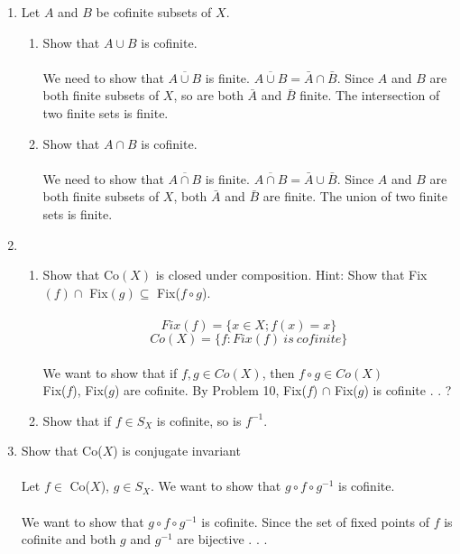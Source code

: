 \documentclass[11pt]{article}
\begin{document}
\begin{enumerate}
\newpage
\item Let $A$ and $B$ be cofinite subsets of $X$.\\
\begin{enumerate}
\item Show that $A \cup B$ is cofinite.\\\\
We need to show that $\overline{A \cup B}$ is finite.  $\overline{A \cup B} = \bar{A} \cap \bar{B}$. Since $A$ and $B$ are both finite subsets of $X$, so are both $\bar{A}$ and $\bar{B}$ finite.  The intersection of two finite sets is finite.
\item Show that $A \cap B$ is cofinite.\\\\
We need to show that $\overline{A \cap B}$ is finite.  $\overline{A \cap B} = \bar{A} \cup \bar{B}$. Since $A$ and $B$ are both finite subsets of $X$, both $\bar{A}$ and $\bar{B}$ are finite.  The union of two finite sets is finite.
\end{enumerate}

\newpage
\item
\begin{enumerate}
\item Show that Co$(X)$ is closed under composition.  Hint: Show that Fix$(f) \cap$ Fix$(g) \subseteq$ Fix($f \circ g$).\\
\\
$$Fix(f) = \{x\in X; f(x) = x\}$$
$$Co(X) = \{f : Fix(f)\ is\ cofinite\}$$
\\
We want to show that if $f,g \in Co(X)$, then $f \circ g \in Co(X)$\\
Fix($f$), Fix($g$) are cofinite.  By Problem 10, Fix($f$) $\cap$ Fix($g$) is cofinite . . ?
\\
\item Show that if $f \in S_X$ is cofinite, so is $f^{-1}$.
\end{enumerate}

\newpage
\item Show that Co($X$) is conjugate invariant
\\
\\
Let $f \in $ Co($X$), $g \in S_X$.  We want to show that $g \circ f \circ g^{-1}$ is cofinite.\\\\
We want to show that $g \circ f \circ g^{-1}$ is cofinite.  Since the set of fixed points of $f$ is cofinite and both $g$ and $g^{-1}$ are bijective . . .


\end{enumerate}
\end{document}
